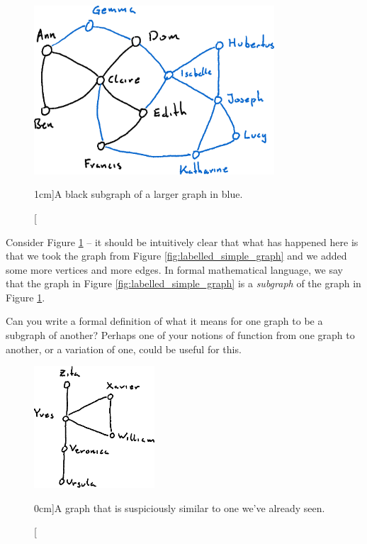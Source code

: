 \documentclass[nobib]{tufte-handout}
\begin{document}
\begin{figure}
  \centering
  \includegraphics[width=0.8\textwidth]{graphics/L1_exc/subgraph.png}
  \caption[][1cm]{A black subgraph of a larger graph in blue.}
  \label{fig:subgraph}
\end{figure}

\begin{xca}
  Consider Figure \ref{fig:subgraph} -- it should be intuitively clear that what has happened here is that we took the graph from Figure \ref{fig:labelled_simple_graph} and we added some more vertices and more edges. In formal mathematical language, we say that the graph in Figure \ref{fig:labelled_simple_graph} is a \emph{subgraph} of the graph in Figure \ref{fig:subgraph}.

  Can you write a formal definition of what it means for one graph to be a subgraph of another? Perhaps one of your notions of function from one graph to another, or a variation of one, could be useful for this.
\end{xca}

\begin{figure}
  \centering
  \includegraphics[width=0.4\textwidth]{graphics/L1_exc/isomorph.png}
  \caption[][0cm]{A graph that is suspiciously similar to one we've already seen.}
  \label{fig:isomorph}
\end{figure}
\end{document}
